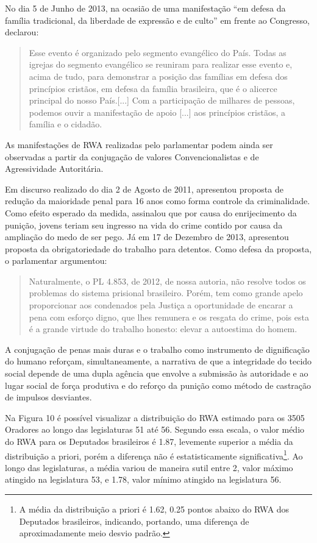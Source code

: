 \documentclass[
12pt,				%
openright,			%
twoside,			%
a4paper,			%
english,			%
french,				%
spanish,			%
brazil				%
]{abntex2}
\begin{document}
No dia 5 de Junho de 2013, na ocasião de uma manifestação ``em defesa da família tradicional, da liberdade de expressão e de culto'' em frente ao Congresso, declarou:

\begin{quotation}
	Esse evento é organizado pelo segmento evangélico do País. Todas as igrejas do segmento evangélico se reuniram para realizar esse evento e, acima de tudo, para demonstrar a posição das famílias em defesa dos princípios cristãos, em defesa da família brasileira, que é o alicerce principal do nosso País.[...] Com a participação de milhares de pessoas, podemos ouvir a manifestação de apoio [...] aos princípios cristãos, a família e o cidadão.
\end{quotation}

As manifestações de RWA realizadas pelo parlamentar podem ainda ser observadas a partir da conjugação de valores Convencionalistas e de Agressividade Autoritária. 

Em discurso realizado do dia 2 de Agosto de 2011, apresentou proposta de redução da maioridade penal para 16 anos como forma controle da criminalidade. Como efeito esperado da medida, assinalou que por causa do enrijecimento da punição, jovens teriam seu ingresso na vida do crime contido por causa da ampliação do medo de ser pego. Já em 17 de Dezembro de 2013, apresentou proposta da obrigatoriedade do trabalho para detentos. Como defesa da proposta, o parlamentar argumentou:

\begin{quotation}
	 Naturalmente, o PL 4.853, de 2012, de nossa autoria, não resolve todos os problemas do sistema prisional brasileiro. Porém, tem como grande apelo proporcionar aos condenados pela Justiça a oportunidade de encarar a pena com esforço digno, que lhes remunera e os resgata do crime, pois esta é a grande virtude do trabalho honesto: elevar a autoestima do homem.
\end{quotation}

A conjugação de penas mais duras e o trabalho como instrumento de dignificação do humano reforçam, simultaneamente, a narrativa de que a integridade do tecido social depende de uma dupla agência que envolve a submissão às autoridade e ao lugar social de força produtiva e do reforço da punição como método de castração de impulsos desviantes.

Na Figura 10 é possível visualizar a distribuição do RWA estimado para os 3505 Oradores ao longo das legislaturas 51 até 56. Segundo essa escala, o valor médio do RWA para os Deputados brasileiros é 1.87, levemente superior a média da distribuição a priori, porém a diferença não é estatisticamente significativa\footnote{A média da distribuição a priori é 1.62, 0.25 pontos abaixo do RWA dos Deputados brasileiros, indicando, portando, uma diferença de aproximadamente meio desvio padrão.}. Ao longo das legislaturas, a média variou de maneira sutil entre 2, valor máximo atingido na legislatura 53, e 1.78, valor mínimo atingido na legislatura 56. 
\end{document}
